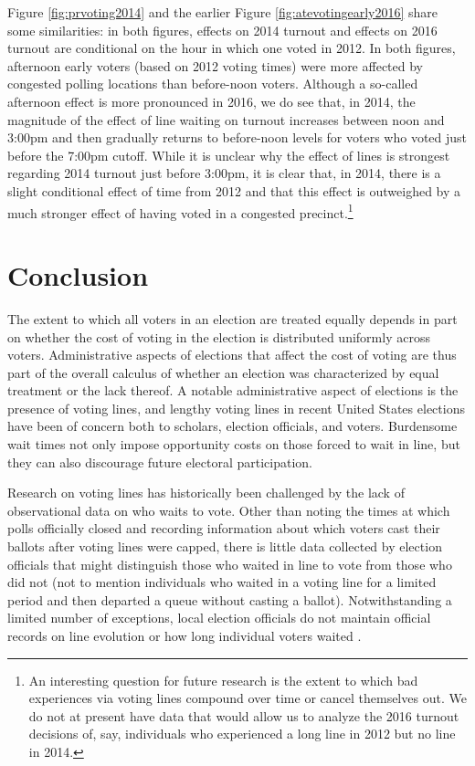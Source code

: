 \documentclass[12pt,titlepage]{article}
\begin{document}
Figure \ref{fig:prvoting2014} and the earlier Figure
\ref{fig:atevotingearly2016} share some similarities: in both figures,
effects on 2014 turnout and effects on 2016 turnout are conditional on
the hour in which one voted in 2012.  In both figures, afternoon early
voters (based on 2012 voting times) were more affected by congested
polling locations than before-noon voters.  Although a so-called
afternoon effect is more pronounced in 2016, we do see that, in 2014,
the magnitude of the effect of line waiting on turnout increases
between noon and 3:00pm and then gradually returns to before-noon
levels for voters who voted just before the 7:00pm cutoff.  While it
is unclear why the effect of lines is strongest regarding 2014 turnout
just before 3:00pm, it is clear that, in 2014, there is a slight
conditional effect of time from 2012 and that this effect is
outweighed by a much stronger effect of having voted in a congested
precinct.\footnote{An interesting question for future research is the
  extent to which bad experiences via voting lines compound over time
  or cancel themselves out.  We do not at present have data that would
  allow us to analyze the 2016 turnout decisions of, say, individuals
  who experienced a long line in 2012 but no line in 2014.}

\section*{Conclusion}

The extent to which all voters in an election are treated equally
depends in part on whether the cost of voting in the election is
distributed uniformly across voters. Administrative aspects of
elections that affect the cost of voting are thus part of the overall
calculus of whether an election was characterized by equal treatment
or the lack thereof.  A notable administrative aspect of elections is
the presence of voting lines, and lengthy voting lines in recent
United States elections have been of concern both to scholars,
election officials, and voters.  Burdensome wait times not only impose
opportunity costs on those forced to wait in line, but they can also
discourage future electoral participation.

Research on voting lines has historically been challenged by the lack
of observational data on who waits to vote.  Other than noting the
times at which polls officially closed and recording information about
which voters cast their ballots after voting lines were capped, there
is little data collected by election officials that might distinguish
those who waited in line to vote from those who did not (not to
mention individuals who waited in a voting line for a limited period
and then departed a queue without casting a ballot).  Notwithstanding
a limited number of exceptions, local election officials do not
maintain official records on line evolution or how long individual
voters waited \citep{herron:confidence}.
\end{document}
